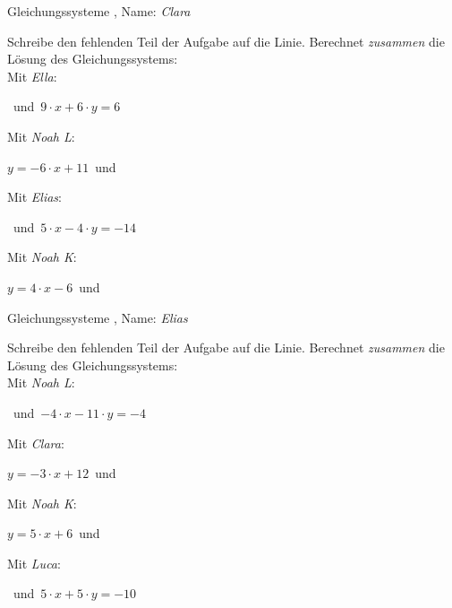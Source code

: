 \begin{center}\large Gleichungssysteme
, Name: \emph{Clara}\end{center}
Schreibe den fehlenden Teil der Aufgabe auf die Linie. Berechnet \emph{zusammen} die Lösung des Gleichungssystems:
\\
\vfill Mit \emph{Ella}:
\begin{center}\underline{}
\mbox{ }und\mbox{ }$9\cdot x+6\cdot y=6$\end{center}
\vfill Mit \emph{Noah L}:
\begin{center}$y=-6\cdot x+11$\mbox{ }und\mbox{ }\underline{}
\end{center}
\vfill Mit \emph{Elias}:
\begin{center}\underline{}
\mbox{ }und\mbox{ }$5\cdot x-4\cdot y=-14$\end{center}
\vfill Mit \emph{Noah K}:
\begin{center}$y=4\cdot x-6$\mbox{ }und\mbox{ }\underline{}
\end{center}
\newpage
\begin{center}\large Gleichungssysteme
, Name: \emph{Elias}\end{center}
Schreibe den fehlenden Teil der Aufgabe auf die Linie. Berechnet \emph{zusammen} die Lösung des Gleichungssystems:
\\
\vfill Mit \emph{Noah L}:
\begin{center}\underline{}
\mbox{ }und\mbox{ }$-4\cdot x-11\cdot y=-4$\end{center}
\vfill Mit \emph{Clara}:
\begin{center}$y=-3\cdot x+12$\mbox{ }und\mbox{ }\underline{}
\end{center}
\vfill Mit \emph{Noah K}:
\begin{center}$y=5\cdot x+6$\mbox{ }und\mbox{ }\underline{}
\end{center}
\vfill Mit \emph{Luca}:
\begin{center}\underline{}
\mbox{ }und\mbox{ }$5\cdot x+5\cdot y=-10$\end{center}

